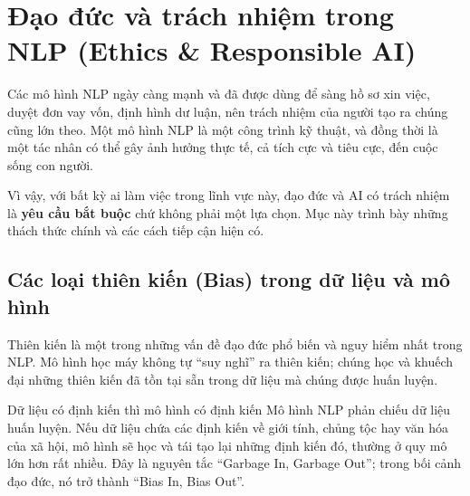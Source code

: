 
\section{Đạo đức và trách nhiệm trong NLP (Ethics \& Responsible AI)}
\label{sec:dao_duc_trach_nhiem}

Các mô hình NLP ngày càng mạnh và đã được dùng để sàng hồ sơ xin việc, duyệt đơn vay vốn, định hình dư luận, nên trách nhiệm của người tạo ra chúng cũng lớn theo. Một mô hình NLP là một công trình kỹ thuật, và đồng thời là một tác nhân có thể gây ảnh hưởng thực tế, cả tích cực và tiêu cực, đến cuộc sống con người.

Vì vậy, với bất kỳ ai làm việc trong lĩnh vực này, đạo đức và AI có trách nhiệm là \textbf{yêu cầu bắt buộc} chứ không phải một lựa chọn. Mục này trình bày những thách thức chính và các cách tiếp cận hiện có.

\subsection{Các loại thiên kiến (Bias) trong dữ liệu và mô hình}
\label{ssec:thien_kien_bias}

Thiên kiến là một trong những vấn đề đạo đức phổ biến và nguy hiểm nhất trong NLP. Mô hình học máy không tự “suy nghĩ” ra thiên kiến; chúng học và khuếch đại những thiên kiến đã tồn tại sẵn trong dữ liệu mà chúng được huấn luyện.

\begin{pitfall}{Dữ liệu có định kiến thì mô hình có định kiến}
Mô hình NLP phản chiếu dữ liệu huấn luyện. Nếu dữ liệu chứa các định kiến về giới tính, chủng tộc hay văn hóa của xã hội, mô hình sẽ học và tái tạo lại những định kiến đó, thường ở quy mô lớn hơn rất nhiều. Đây là nguyên tắc “Garbage In, Garbage Out”; trong bối cảnh đạo đức, nó trở thành “Bias In, Bias Out”.
\end{pitfall}

